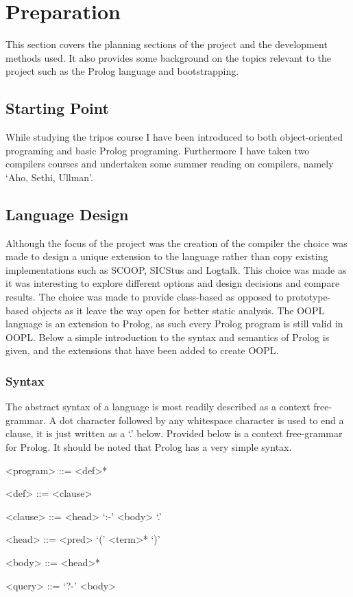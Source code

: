 \documentclass[12pt,a4paper,twoside,openright]{report}
\begin{document}
\chapter{Preparation}

This section covers the planning sections of the project and the development methods used. It also provides some background on the topics relevant to the project such as the Prolog language and bootstrapping.

\section{Starting Point}

While studying the tripos course I have been introduced to both object-oriented programing and basic Prolog programing. Furthermore I have taken two compilers courses and undertaken some summer reading on compilers, namely `Aho, Sethi, Ullman'\cite{DRAGON}.

\section {Language Design}

Although the focus of the project was the creation of the compiler the choice was made to design a unique extension to the language rather than copy existing implementations such as SCOOP, SICStus and Logtalk. This choice was made as it was interesting to explore different options and design decisions and compare results. The choice was made to provide class-based as opposed to prototype-based objects as it leave the way open for better static analysis. The OOPL language is an extension to Prolog, as such every Prolog program is still valid in OOPL. Below a simple introduction to the syntax and semantics of Prolog is given, and the extensions that have been added to create OOPL.

\subsection {Syntax}

The abstract syntax of a language is most readily described as a context free-grammar. A dot character followed by any whitespace character is used to end a clause, it is just written as a `.' below. Provided below is a context free-grammar for Prolog. It should be noted that Prolog has a very simple syntax.

\begin{grammar}

<program> ::= <def>*
		
<def> ::= <clause>
		
<clause> ::= <head> `:-' <body> `.'
		
<head> 	::= <pred> `(' <term>* `)'
		
<body> ::= <head>*

<query> ::= `?-' <body>

\end{grammar}		
\end{document}
